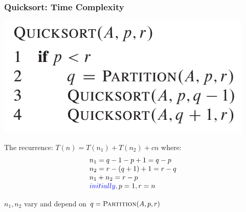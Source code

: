 \documentclass[UTF8,11pt,handout]{beamer}
\begin{document}
\begin{frame}[t]
\begin{columns}
\begin{block}{}
{		\vspace{0.2cm}
	}
	\end{block}
	
	\end{columns}
\end{frame}

\begin{frame}[t]
	\frametitle{Quicksort: Time Complexity}
	\begin{center}
		\includegraphics{figs/quicksort.png}
	\end{center}

	\begin{center}
	\pause	\begin{block}{The recurrence: $T(n)=T(n_1)+T(n_2)+cn$} where:
	\pause		\[
				\begin{array}{ll}
					n_1=q-1-p+1=q-p\\
					n_2=r-(q+1)+1=r-q\\
					n_1+n_2=r-p\\
					{\color{blue}initially}, p=1, r=n
				\end{array}
			\] 
			
\pause		$n_1,n_2$ vary and depend on 	{\color{blue}$q=\textproc{Partition}(A,p,r)$}
		\end{block}
	\end{center}
\end{frame}
\end{document}
